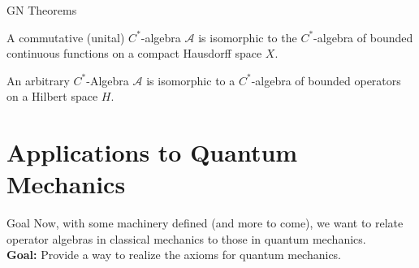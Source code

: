 \documentclass[pdf]{beamer}
\theoremstyle{definition}
\theoremstyle{theorem}
\newcommand{\A}{\mathcal{A}}
\begin{document}
	\begin{frame}{GN Theorems}
	\begin{theorem}
	A commutative (unital) $C^*$-algebra $\A$ is isomorphic to the $C^*$-algebra of bounded continuous functions on a compact Hausdorff space $X$.
	\end{theorem}
	\begin{theorem}
	An arbitrary $C^*$-Algebra $\A$ is isomorphic to a $C^*$-algebra of bounded operators on a Hilbert space $H$.
	\end{theorem}
	\end{frame}		
	
	

%	
%	

\section{Applications to Quantum Mechanics}
\begin{frame}{Goal}
Now, with some machinery defined (and more to come), we want to relate operator algebras in classical mechanics to those in quantum mechanics. \\
\textbf{Goal:} Provide a way to realize the axioms for quantum mechanics.
\end{frame}
\end{document}
